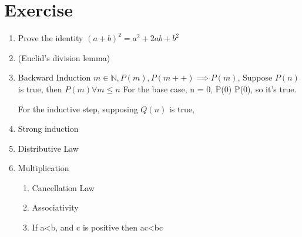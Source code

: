 \documentclass[11pt]{report}
\begin{document}
\section{Exercise}
\label{sec:orgb3beffe}
\begin{enumerate}
\item Prove the identity \((a+b)^2 = a^2 + 2ab + b^2\)
\label{sec:org7c5427a}
\item (Euclid's division lemma)
\label{sec:org825b06e}
\item Backward Induction
\label{sec:orgbd79f92}
\(m \in \mathbb{N}, P(m), P(m++) \implies P(m)\), Suppose \(P(n)\) is true, then \(P(m) \forall m \le n\)
For the base case, n = 0,
P(0) \implies P(0), so it's true.

For the inductive step, supposing \(Q(n)\) is true,
\item Strong induction
\label{sec:org338c40c}
\item Distributive Law
\label{sec:orgf797fb5}
\item Multiplication
\label{sec:org9e1b285}
\begin{enumerate}
\item Cancellation Law
\label{sec:org77c470e}
\item Associativity
\label{sec:org2895045}
\item If a<b, and c is positive then ac<bc
\label{sec:orge4c3fac}
\end{enumerate}
\end{enumerate}
\end{document}
